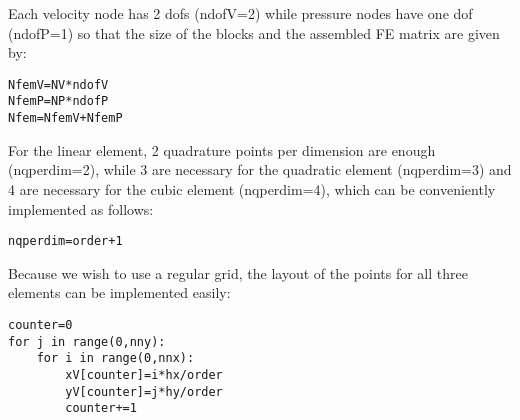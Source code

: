 Each velocity node has 2 dofs (ndofV=2) while pressure nodes have one dof (ndofP=1) so that 
the size of the blocks and the assembled FE matrix are given by:

\begin{lstlisting}
NfemV=NV*ndofV      
NfemP=NP*ndofP    
Nfem=NfemV+NfemP
\end{lstlisting}

For the linear element, 2 quadrature points per dimension are enough (nqperdim=2), 
while 3 are necessary for the quadratic element (nqperdim=3) and 4 are 
necessary for the cubic element (nqperdim=4), which can be conveniently implemented as follows:
\begin{lstlisting}
nqperdim=order+1
\end{lstlisting}

Because we wish to use a regular grid, the layout of the points for all three elements 
can be implemented easily:

\begin{lstlisting}
counter=0    
for j in range(0,nny):
    for i in range(0,nnx):
        xV[counter]=i*hx/order
        yV[counter]=j*hy/order
        counter+=1
\end{lstlisting}




